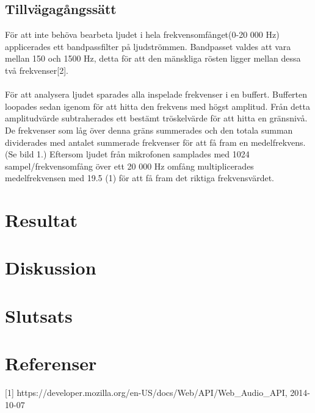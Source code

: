 \documentclass[12pt, titlepage, twoside, a4paper]{article}
\begin{document}
\subsection{Tillvägagångssätt}
För att inte behöva bearbeta ljudet i hela frekvensomfånget(0-20 000 Hz) applicerades ett bandpassfilter på ljudströmmen. Bandpasset valdes att vara mellan 150 och 1500 Hz, detta för att den mänskliga rösten ligger mellan dessa två frekvenser[2].
\\ \\
För att analysera ljudet sparades alla inspelade frekvenser i en buffert. Bufferten loopades sedan igenom för att hitta den frekvens med högst amplitud. Från detta amplitudvärde subtraherades ett bestämt tröskelvärde för att hitta en gränsnivå. De frekvenser som låg över denna gräns summerades och den totala summan dividerades med antalet summerade frekvenser för att få fram en medelfrekvens. (Se bild 1.) Eftersom ljudet från mikrofonen samplades med 1024 sampel/frekvensomfång över ett 20 000 Hz omfång multiplicerades medelfrekvensen med 19.5 (1) för att få fram det riktiga frekvensvärdet. 
\section{Resultat}
\section{Diskussion}
\section{Slutsats}
\section{Referenser}
[1] https://developer.mozilla.org/en-US/docs/Web/API/Web\_Audio\_API, 2014-10-07
\end{document}
